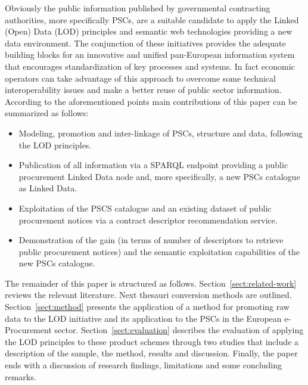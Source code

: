 Obviously the public information published by governmental contracting authorities, more specifically PSCs, are a suitable candidate to apply the Linked (Open) Data 
(LOD) principles and semantic web technologies providing a new data environment. The conjunction of these initiatives provides the adequate building blocks for an 
innovative and unified pan-European information system that encourages standardization of key processes and systems. In fact economic operators can 
take advantage of this approach to overcome some technical interoperability issues and make a better reuse of public sector information. According to the 
aforementioned points main contributions of this paper can be summarized as follows:
\begin{itemize}
\item Modeling, promotion and inter-linkage of PSCs, structure and data, following the LOD principles.
\item Publication of all information via a SPARQL endpoint providing a public procurement Linked Data node and, more specifically, a new PSCs catalogue as Linked Data.
\item Exploitation of the PSCS catalogue and an existing dataset of public procurement notices via a contract descriptor recommendation service.
\item Demonstration of the gain (in terms of number of descriptors to retrieve public procurement notices) and the semantic exploitation 
capabilities of the new PSCs catalogue.
\end{itemize}

The remainder of this paper is structured as follows. Section~\ref{sect:related-work} reviews the relevant literature. Next thesauri 
conversion methods are outlined. Section~\ref{sect:method} presents the application of a method for promoting raw data to the LOD initiative 
and its application to the PSCs in the European e-Procurement sector. Section~\ref{sect:evaluation} describes the evaluation of applying the LOD principles to 
these product schemes through two studies that include a description of the sample, the method, results and discussion. Finally, 
the paper ends with a discussion of research findings, limitations and some concluding remarks.
